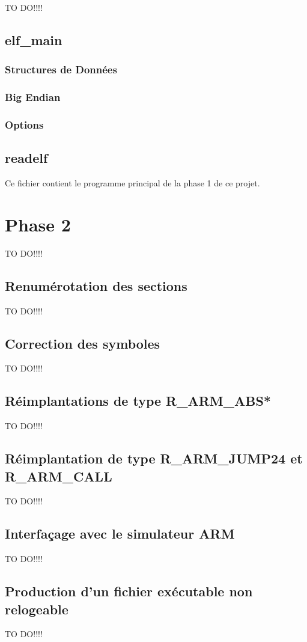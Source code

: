 \documentclass[a4paper]{article} %
\begin{document}
TO DO!!!!


\subsection{elf\_main}

\subsubsection*{Structures de Données}

\subsubsection*{Big Endian}

\subsubsection*{Options}
\label{sec:options}


\subsection{readelf}
\label{sec:readelf}
Ce fichier contient le programme principal de la phase 1 de ce projet. 



\section{Phase 2}
\label{sec:phase2}
TO DO!!!!

\subsection{Renumérotation des sections}
TO DO!!!!

\subsection{Correction des symboles}
TO DO!!!!

\subsection{Réimplantations de type R\_ARM\_ABS*}
TO DO!!!!

\subsection{Réimplantation de type R\_ARM\_JUMP24 et R\_ARM\_CALL}
TO DO!!!!

\subsection{Interfaçage avec le simulateur ARM}
TO DO!!!!

\subsection{Production d’un fichier exécutable non relogeable}

TO DO!!!!
\end{document}
